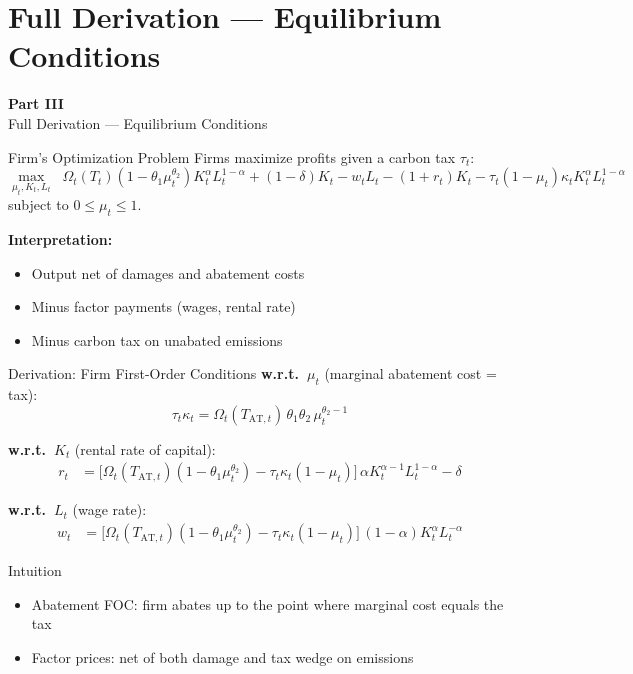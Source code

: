 \documentclass[aspectratio=169,11pt]{beamer}
\newcommand{\emphc}[1]{\textcolor{harvardcrimson}{#1}}
\begin{document}
\section{Full Derivation --- Equilibrium Conditions}

\begin{frame}{}
\vfill
\begin{center}
{\Huge \textcolor{uzhblue}{\textbf{Part III}}}\\[12pt]
{\LARGE Full Derivation --- Equilibrium Conditions}
\end{center}
\vfill
\end{frame}

\begin{frame}{Firm's Optimization Problem}
\small
Firms maximize profits given a carbon tax $\tau_t$:
\[
\max_{\mu_t, K_t, L_t} \;\; \Omega_t(T_t)(1-\theta_1 \mu_t^{\theta_2})K_t^\alpha L_t^{1-\alpha} + (1-\delta)K_t - w_t L_t - (1+r_t)K_t - \tau_t(1-\mu_t)\kappa_t K_t^\alpha L_t^{1-\alpha}
\]
subject to $0 \leq \mu_t \leq 1$.

\vspace{0.2cm}
\textbf{Interpretation:}
\begin{itemize}
    \item Output net of damages and abatement costs
    \item Minus factor payments (wages, rental rate)
    \item Minus carbon tax on unabated emissions
\end{itemize}
\end{frame}

\begin{frame}{Derivation: Firm First-Order Conditions}
\small
\textbf{w.r.t.\ $\mu_t$} (marginal abatement cost = tax):
\[
\tau_t \kappa_t = \Omega_t(T_{\mathrm{AT},t})\, \theta_1 \theta_2\, \mu_t^{\theta_2 - 1}
\]

\textbf{w.r.t.\ $K_t$} (rental rate of capital):
\begin{align*}
r_t &= \Big[\Omega_t(T_{\mathrm{AT},t})(1-\theta_1 \mu_t^{\theta_2}) - \tau_t \kappa_t(1-\mu_t)\Big]\, \alpha K_t^{\alpha-1} L_t^{1-\alpha} - \delta
\end{align*}

\textbf{w.r.t.\ $L_t$} (wage rate):
\begin{align*}
w_t &= \Big[\Omega_t(T_{\mathrm{AT},t})(1-\theta_1 \mu_t^{\theta_2}) - \tau_t \kappa_t(1-\mu_t)\Big]\, (1-\alpha) K_t^\alpha L_t^{-\alpha}
\end{align*}

\vspace{0.2cm}
\begin{exampleblock}{Intuition}
\begin{itemize}
    \item Abatement FOC: firm abates up to the point where marginal cost equals the tax
    \item Factor prices: net of both damage \emphc{and} tax wedge on emissions
\end{itemize}
\end{exampleblock}
\end{frame}
\end{document}
